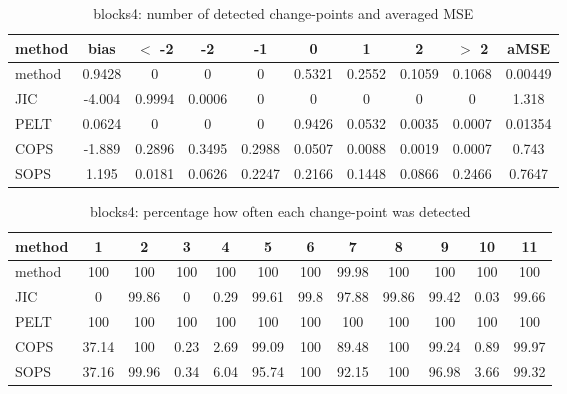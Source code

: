 \begin{table}[ht]
\centering
\begin{tabular}{l|c|ccccccc|c}
  \hline
method & bias & $<$ -2 & -2 & -1 & 0 & 1 & 2 & $>$ 2 & aMSE \\ 
  \hline
method & 0.9428 &     0 &     0 &     0 & 0.5321 & 0.2552 & 0.1059 & 0.1068 & 0.00449 \\ 
  JIC & -4.004 & 0.9994 & 0.0006 &     0 &     0 &     0 &     0 &     0 & 1.318 \\ 
  PELT & 0.0624 &     0 &     0 &     0 & 0.9426 & 0.0532 & 0.0035 & 0.0007 & 0.01354 \\ 
  COPS & -1.889 & 0.2896 & 0.3495 & 0.2988 & 0.0507 & 0.0088 & 0.0019 & 0.0007 & 0.743 \\ 
  SOPS & 1.195 & 0.0181 & 0.0626 & 0.2247 & 0.2166 & 0.1448 & 0.0866 & 0.2466 & 0.7647 \\ 
   \hline
\end{tabular}
\caption{blocks4: number of detected change-points and averaged MSE} 
\label{tab:blocks4Njumps}
\end{table}
\begin{table}[ht]
\centering
\begin{tabular}{l|ccccccccccc}
  \hline
method & 1 & 2 & 3 & 4 & 5 & 6 & 7 & 8 & 9 & 10 & 11 \\ 
  \hline
method &    100 &    100 &    100 &    100 &    100 &    100 &  99.98 &    100 &    100 &    100 &    100 \\ 
  JIC &      0 &  99.86 &      0 &   0.29 &  99.61 &   99.8 &  97.88 &  99.86 &  99.42 &   0.03 &  99.66 \\ 
  PELT &    100 &    100 &    100 &    100 &    100 &    100 &    100 &    100 &    100 &    100 &    100 \\ 
  COPS &  37.14 &    100 &   0.23 &   2.69 &  99.09 &    100 &  89.48 &    100 &  99.24 &   0.89 &  99.97 \\ 
  SOPS &  37.16 &  99.96 &   0.34 &   6.04 &  95.74 &    100 &  92.15 &    100 &  96.98 &   3.66 &  99.32 \\ 
   \hline
\end{tabular}
\caption{blocks4: percentage how often each change-point was detected} 
\label{tab:blocks4Detections}
\end{table}
